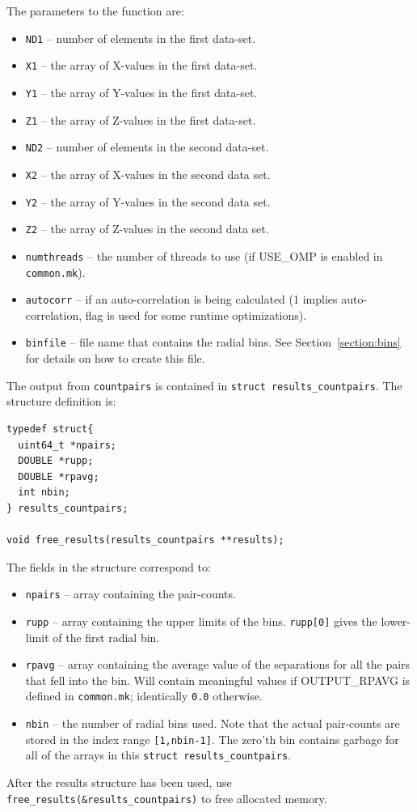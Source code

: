 \documentclass[12pt,titlepage]{article}
\newcommand{\xir}{\ensuremath{{DD(r)}}\xspace}
\begin{document}
The parameters to the function are:
\begin{itemize}
\item \texttt{ND1} -- number of elements in the first data-set.
\item \texttt{X1}  -- the array of X-values in the first data-set.
\item \texttt{Y1}  -- the array of Y-values in the first data-set.
\item \texttt{Z1}  -- the array of Z-values in the first data-set.
\item \texttt{ND2} -- number of elements in the second data-set.
\item \texttt{X2}  -- the array of X-values in the second data set.
\item \texttt{Y2}  -- the array of Y-values in the second data set.
\item \texttt{Z2}  -- the array of Z-values in the second data set.
\item \texttt{numthreads} -- the number of threads to use (if USE\_OMP is enabled in \texttt{common.mk}).
\item \texttt{autocorr} -- if an auto-correlation is being calculated (1 implies auto-correlation, flag is used for some runtime optimizations).
\item \texttt{binfile} -- file name that contains the radial bins. See Section~\ref{section:bins} for details on how to create this file.
\end{itemize}

The output from \texttt{countpairs} is contained in \texttt{struct results\_countpairs}. The structure
definition is:
\begin{lstlisting}[label={code:API_DD_struct},caption={Structure definition for the output of \xir.}]
typedef struct{
  uint64_t *npairs;
  DOUBLE *rupp;
  DOUBLE *rpavg;
  int nbin;
} results_countpairs;

void free_results(results_countpairs **results);
\end{lstlisting}

The fields in the structure correspond to:
\begin{itemize}
\item \texttt{npairs} -- array containing the pair-counts. 
\item \texttt{rupp}   -- array containing the upper limits of the bins. \texttt{rupp[0]} gives the lower-limit of the first radial bin. 
\item \texttt{rpavg}  -- array containing the average value of the separations for all the pairs that fell into the bin. Will contain 
meaningful values if OUTPUT\_RPAVG is defined in \texttt{common.mk}; identically \texttt{0.0} otherwise. 
\item \texttt{nbin}   -- the number of radial bins used. Note that the actual pair-counts are stored in the index range \texttt{[1,nbin-1]}. The
zero'th bin contains garbage for all of the arrays in this \texttt{struct results\_countpairs}.
\end{itemize}
After the results structure has been used, use \texttt{free\_results(\&results\_countpairs)} to free allocated memory. 
\end{document}
